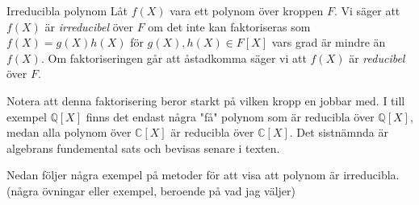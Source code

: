 \documentclass{article}
\newcommand{\grad}[0]{\textnormal{deg}}
\theoremstyle{definition}
\begin{document}

\begin{mydef}{Irreducibla polynom}{}
  Låt $f(X)$ vara ett polynom över kroppen $F$. Vi säger att $f(X)$ är \textit{irreducibel} över $F$ om det inte kan faktoriseras som $f(X) = g(X)h(X)$
  för $g(X), h(X) \in F[X]$ vars grad är mindre än $f(X)$. Om faktoriseringen går att åstadkomma säger vi att $f(X)$ är \textit{reducibel} över $F.$
\end{mydef}
Notera att denna faktorisering beror starkt på vilken kropp en jobbar med. I till exempel $\mathbb{Q}[X]$ finns det endast några "få" polynom som är reducibla
över $\mathbb{Q}[X]$, medan alla polynom över $\mathbb{C}[X]$ är reducibla över $\mathbb{C}[X]$. Det sistnämnda är algebrans fundemental sats och 
bevisas senare i texten.

Nedan följer några exempel på metoder för att visa att polynom är irreducibla. 
(några övningar eller exempel, beroende på vad jag väljer)
\end{document}
